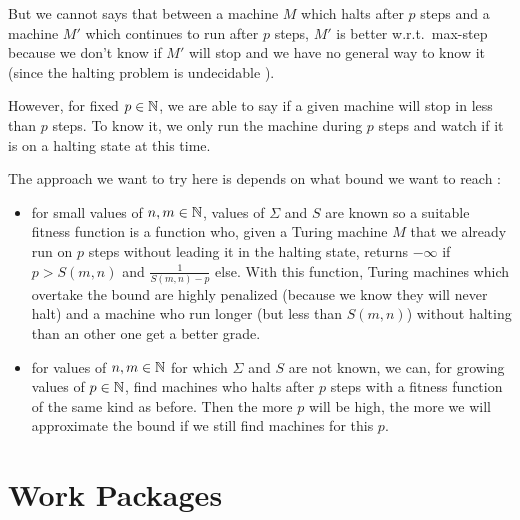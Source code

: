 \documentclass{article}
\begin{document}
But we cannot says that between a machine $M$ which halts after $p$ steps and a machine $M'$ which continues to run after $p$ steps, $M'$ is better w.r.t.\ max-step because we don't know if $M'$ will stop and we have no general way to know it (since the halting problem is undecidable \cite{turing}).

However, for fixed $p \in \mathbb{N}$, we are able to say if a given machine will stop in less than $p$ steps. To know it, we only run the machine during $p$ steps and watch if it is on a halting state at this time.

The approach we want to try here is depends on what bound we want to reach :
\begin{itemize}
\item for small values of $n,m \in \mathbb{N}$, values of $\Sigma$ and $S$ are known \cite{rado} so a suitable fitness function is a function who, given a Turing machine $M$ that we already run on $p$ steps without leading it in the halting state, returns $- \infty$ if $p > S(m,n)$ and $\frac{1}{S(m,n) - p}$ else. With this function, Turing machines which overtake the bound are highly penalized (because we know they will never halt) and a machine who run longer (but less than $S(m,n)$) without halting than an other one get a better grade.
\item for values of $n, m \in \mathbb{N}$ for which $\Sigma$ and $S$ are not known, we can, for growing values of $p \in \mathbb{N}$, find machines who halts after $p$ steps with a fitness function of the same kind as before. Then the more $p$ will be high, the more we will approximate the bound if we still find machines for this $p$.
\end{itemize}

\section{Work  Packages}
\end{document}
